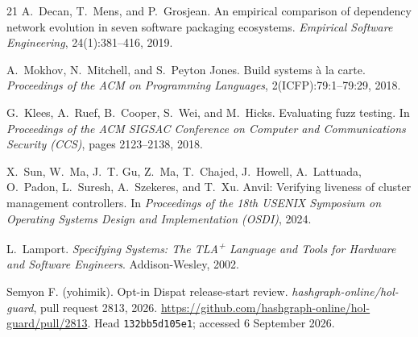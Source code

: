 \documentclass[sigconf,nonacm]{acmart}
\begin{document}
\begin{thebibliography}{21}
A.~Decan, T.~Mens, and P.~Grosjean.
An empirical comparison of dependency network evolution in seven
software packaging ecosystems.
\emph{Empirical Software Engineering}, 24(1):381--416, 2019.

A.~Mokhov, N.~Mitchell, and S.~Peyton Jones.
Build systems \`a la carte.
\emph{Proceedings of the ACM on Programming Languages},
2(ICFP):79:1--79:29, 2018.

G.~Klees, A.~Ruef, B.~Cooper, S.~Wei, and M.~Hicks.
Evaluating fuzz testing.
In \emph{Proceedings of the ACM SIGSAC Conference on Computer and
Communications Security (CCS)}, pages 2123--2138, 2018.

X.~Sun, W.~Ma, J.~T. Gu, Z.~Ma, T.~Chajed, J.~Howell, A.~Lattuada,
O.~Padon, L.~Suresh, A.~Szekeres, and T.~Xu.
Anvil: Verifying liveness of cluster management controllers.
In \emph{Proceedings of the 18th USENIX Symposium on Operating Systems
Design and Implementation (OSDI)}, 2024.

L.~Lamport.
\emph{Specifying Systems: The TLA\textsuperscript{+} Language and
Tools for Hardware and Software Engineers}.
Addison-Wesley, 2002.


Semyon F. (yohimik). Opt-in Dispat release-start review.
\emph{hashgraph-online/hol-guard}, pull request 2813, 2026.
\url{https://github.com/hashgraph-online/hol-guard/pull/2813}.
Head \texttt{132bb5d105e1}; accessed 6 September 2026.

\end{thebibliography}
\end{document}
